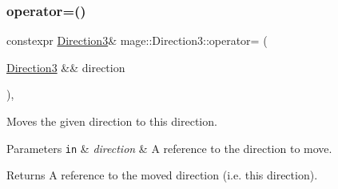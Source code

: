 \subsubsection{\texorpdfstring{operator=()}{operator=()}\hspace{0.1cm}{\footnotesize\ttfamily [2/2]}}
{\footnotesize\ttfamily constexpr \hyperlink{structmage_1_1_direction3}{Direction3}\& mage\+::\+Direction3\+::operator= (\begin{DoxyParamCaption}\item[{\hyperlink{structmage_1_1_direction3}{Direction3} \&\&}]{direction }\end{DoxyParamCaption})\hspace{0.3cm}{\ttfamily [default]}, {\ttfamily [noexcept]}}

Moves the given direction to this direction.


\begin{DoxyParams}[1]{Parameters}
\mbox{\tt in}  & {\em direction} & A reference to the direction to move. \\
\hline
\end{DoxyParams}
\begin{DoxyReturn}{Returns}
A reference to the moved direction (i.\+e. this direction). 
\end{DoxyReturn}
